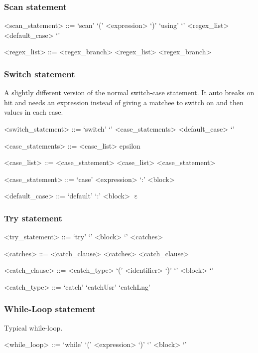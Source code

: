 %
\subsubsection{Scan statement}

\begin{grammar}
<scan_statement> ::= `scan' `(' <expression> `)' `using' `{' <regex_list> <default_case> `}'

<regex_list> ::= <regex_branch>
\alt <regex_list> <regex_branch>
\end{grammar}

%
\subsubsection{Switch statement}

A slightly different version of the normal switch-case statement. It auto breaks on hit and needs an expression instead of giving a matchee to switch on and  then values in each case.

\begin{grammar}
<switch_statement> ::= `switch' `{' <case_statements> <default_case> `}'

<case_statements> ::= <case_list>
\alt epsilon

<case_list> ::= <case_statement>
\alt <case_list> <case_statement>

<case_statement> ::= `case' <expression> `:' <block>

<default_case> ::= `default' `:' <block>
\alt $\upepsilon$
\end{grammar}

%
\subsubsection{Try statement}

\begin{grammar}
<try_statement> ::= `try' `{' <block> `}' <catches>

<catches> ::= <catch_clause>
\alt <catches> <catch_clause>

<catch_clause> ::= <catch_type> `(' <identifier> `)' `{' <block> `}'

<catch_type> ::= `catch'
\alt `catchUsr'
\alt `catchLng'
\end{grammar}

%
\subsubsection{While-Loop statement}

Typical while-loop.

\begin{grammar}
<while_loop> ::= `while' `(' <expression> `)' `{' <block> `}'
\end{grammar}

\clearpage

\begin{verbatim}








 \end{verbatim}